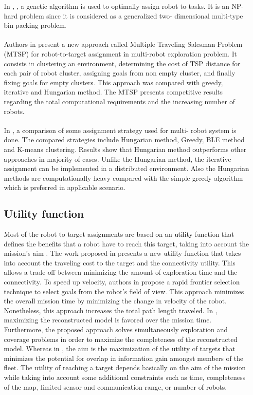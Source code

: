 \documentclass[11pt,openany]{book}
\begin{document}
In \cite{zhao1996genetic}, \cite{leigh2007using}, a genetic algorithm is used to optimally assign robot to tasks. It is an NP-hard problem since it is considered as a generalized two- dimensional multi-type bin packing problem.\\\\
Authors in \cite{faigl2012goal} present a new approach called Multiple Traveling Salesman Problem (MTSP) for robot-to-target assignment in multi-robot exploration problem. It consists in clustering an environment, determining the cost of TSP distance for each pair of robot cluster, assigning goals from non empty cluster, and ﬁnally ﬁxing goals for empty clusters. This approach was compared with greedy, iterative and Hungarian method. The MTSP presents competitive results regarding the total computational requirements and the increasing number of robots.\\\\
In \cite{kulich2015comparison}, a comparison of some assignment strategy used for multi- robot system is done. The compared strategies include Hungarian method, Greedy, BLE method and K-means clustering. Results show that Hungarian method outperforms other approaches in majority of cases. Unlike the Hungarian method, the iterative assignment can be implemented in a distributed environment. Also the Hungarian methods are computationally heavy compared with the simple greedy algorithm which is preferred in applicable scenario.
\subsection{Utility function}
Most of the robot-to-target assignments are based on an utility function that deﬁnes the beneﬁts that a robot have to reach this target, taking into account the mission’s aim \cite{burgard2000collaborative}. The work proposed in \cite{benavides2016multi} presents a new utility function that takes into account the traveling cost to the target and the connectivity utility. This allows a trade oﬀ between minimizing the amount of exploration time and the connectivity. To speed up velocity, authors in \cite{cieslewski2017rapid} propose a rapid frontier selection technique to select goals from the robot’s ﬁeld of view. This approach minimizes the overall mission time by minimizing the change in velocity of the robot. Nonetheless, this approach increases the total path length traveled. In \cite{heng2015efficient}, maximizing the reconstructed model is favored over the mission time. Furthermore, the proposed approach solves simultaneously exploration and coverage problems in order to maximize the completeness of the reconstructed model. Whereas in \cite{simmons2000coordination}, the aim is the maximization of the utility of targets that minimizes the potential for overlap in information gain amongst members of the ﬂeet. The utility of reaching a target depends basically on the aim of the mission while taking into account some additional constraints such as time, completeness of the map, limited sensor and communication range, or number of robots.
\end{document}
